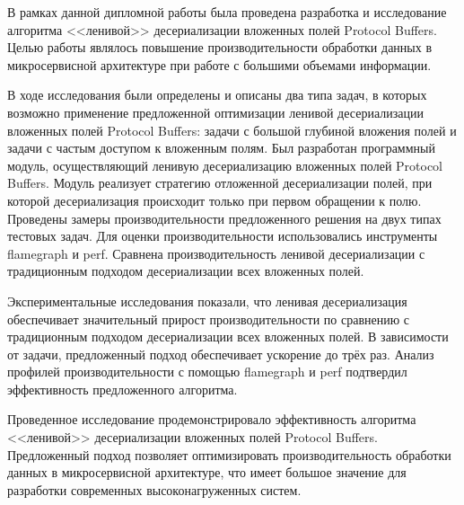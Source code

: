 
В рамках данной дипломной работы была проведена разработка и исследование алгоритма <<ленивой>> десериализации 
вложенных полей Protocol Buffers. Целью работы являлось повышение производительности обработки данных 
в микросервисной архитектуре при работе с большими объемами информации.

В ходе исследования были определены и описаны два типа задач, в которых возможно применение предложенной оптимизации ленивой десериализации вложенных полей Protocol Buffers: задачи с большой глубиной вложения полей и задачи с частым доступом к вложенным полям.
Был разработан программный модуль, осуществляющий ленивую десериализацию вложенных полей Protocol Buffers. Модуль реализует стратегию отложенной десериализации полей, при которой десериализация происходит только при первом обращении к полю.
Проведены замеры производительности предложенного решения на двух типах тестовых задач. Для оценки производительности использовались инструменты flamegraph и perf.
Сравнена производительность ленивой десериализации с традиционным подходом десериализации всех вложенных полей.

Экспериментальные исследования показали, что ленивая десериализация обеспечивает значительный прирост производительности по сравнению с традиционным подходом десериализации всех вложенных полей. В зависимости от задачи, предложенный подход обеспечивает ускорение до трёх раз.
Анализ профилей производительности с помощью flamegraph и perf подтвердил эффективность предложенного алгоритма.

Проведенное исследование продемонстрировало эффективность алгоритма <<ленивой>> десериализации вложенных полей Protocol Buffers. Предложенный подход позволяет оптимизировать производительность обработки данных в микросервисной архитектуре, что имеет большое значение для разработки современных высоконагруженных систем.
